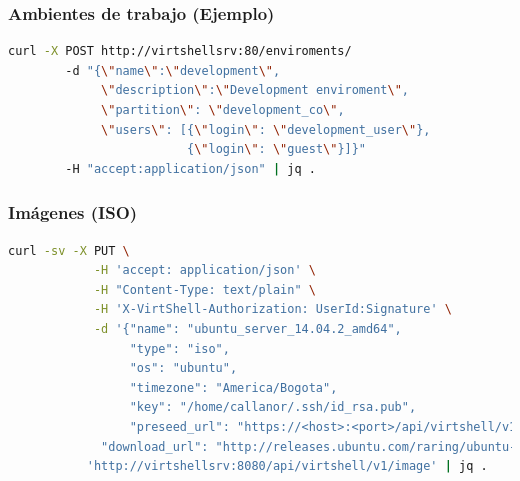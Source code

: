 \documentclass[xcolor=dvipsnames,table]{beamer} %
\begin{document}

\begin{frame}[fragile]
	\frametitle{Ambientes de trabajo (Ejemplo)}
	\begin{lstlisting}[language=Bash,basicstyle=\ttfamily\scriptsize,keywordstyle=\color{blue}]
	curl -X POST http://virtshellsrv:80/enviroments/ 
	    -d "{\"name\":\"development\",
	         \"description\":\"Development enviroment\", 
	         \"partition\": \"development_co\", 
	         \"users\": [{\"login\": \"development_user\"}, 
	                     {\"login\": \"guest\"}]}" 
	    -H "accept:application/json" | jq .
	\end{lstlisting}
\end{frame}



\begin{frame}[fragile]
	\frametitle{Imágenes (ISO)}
	\begin{lstlisting}[language=Bash,basicstyle=\ttfamily\scriptsize,keywordstyle=\color{blue}]
		curl -sv -X PUT \
		    -H 'accept: application/json' \
		    -H "Content-Type: text/plain" \
		    -H 'X-VirtShell-Authorization: UserId:Signature' \
		    -d '{"name": "ubuntu_server_14.04.2_amd64",
		         "type": "iso",
		         "os": "ubuntu",
		         "timezone": "America/Bogota", 
		         "key": "/home/callanor/.ssh/id_rsa.pub",
		         "preseed_url": "https://<host>:<port>/api/virtshell/v1/files/seeds/seed_ubuntu14-04.txt",
		     "download_url": "http://releases.ubuntu.com/raring/ubuntu-14.04-server-amd64.iso"}' \
		   'http://virtshellsrv:8080/api/virtshell/v1/image' | jq .
	\end{lstlisting}
\end{frame}
\end{document}
